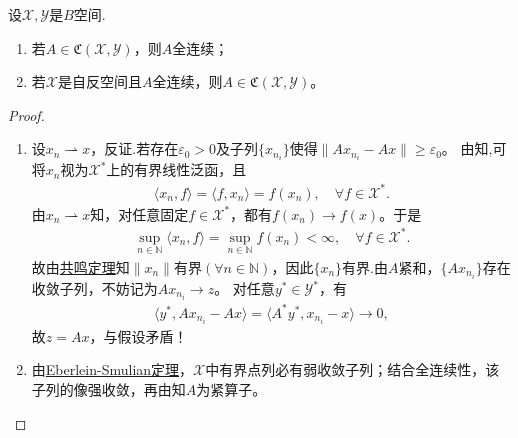 \documentclass[../../main.tex]{subfiles}%
\begin{document}
\begin{proposition}
设$\mathscr{X},\mathscr{Y}$是$B$空间.
\begin{enumerate}[(1)]
\item 若$A\in\mathfrak{C}(\mathscr{X},\mathscr{Y})$，则$A$全连续；

\item 若$\mathscr{X}$是自反空间且$A$全连续，则$A\in\mathfrak{C}(\mathscr{X},\mathscr{Y})$。
\end{enumerate}
\end{proposition}
\begin{proof}
\begin{enumerate}[(1)]
\item 设$x_n\rightharpoonup x$，反证.若存在$\varepsilon_0>0$及子列$\{x_{n_i}\}$使得$\|Ax_{n_i}-Ax\|\geqslant\varepsilon_0$。
由知,可将$x_n$视为$\mathscr{X}^*$上的有界线性泛函，且
\begin{align*}
\langle x_n,f \rangle = \langle f,x_n \rangle = f(x_n),\quad \forall f\in \mathscr{X}^*.
\end{align*}
由$x_n\rightharpoonup x$知，对任意固定$f\in \mathscr{X}^*$，都有$f(x_n)\rightarrow f(x)$。于是
\begin{align*}
\sup\limits_{n\in \mathbb{N}}\langle x_n,f \rangle = \sup\limits_{n\in \mathbb{N}}f(x_n) < \infty,\quad \forall f\in \mathscr{X}^*.
\end{align*}
故由\hyperref[theorem:泛函分析--共鸣定理]{共鸣定理}知$\|x_n\|$有界$(\forall n\in \mathbb{N})$，因此$\{x_n\}$有界.由$A$紧和，$\{Ax_{n_i}\}$存在收敛子列，不妨记为$Ax_{n_i}\to z$。
对任意$y^*\in\mathscr{Y}^*$，有
\begin{align*}
\langle y^*,Ax_{n_i}-Ax\rangle=\langle A^*y^*,x_{n_i}-x\rangle\to0,
\end{align*}
故$z=Ax$，与假设矛盾！

\item 由\hyperref[theorem:Eberlein-Smulian定理]{Eberlein-Smulian定理}，$\mathscr{X}$中有界点列必有弱收敛子列；结合全连续性，该子列的像强收敛，再由知$A$为紧算子。
\end{enumerate}
\end{proof}
\end{document}
